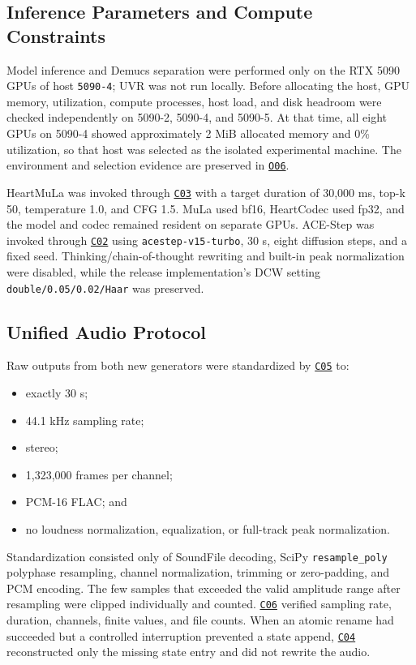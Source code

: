 \documentclass[11pt,a4paper]{article}
\newcommand{\coderef}[1]{\hyperlink{code:#1}{\texttt{#1}}}
\newcommand{\outref}[1]{\hyperlink{output:#1}{\texttt{#1}}}
\begin{document}
\subsection{Inference Parameters and Compute Constraints}

Model inference and Demucs separation were performed only on the RTX 5090 GPUs of host \texttt{5090-4}; UVR was not run locally. Before allocating the host, GPU memory, utilization, compute processes, host load, and disk headroom were checked independently on 5090-2, 5090-4, and 5090-5. At that time, all eight GPUs on 5090-4 showed approximately 2 MiB allocated memory and 0\% utilization, so that host was selected as the isolated experimental machine. The environment and selection evidence are preserved in \outref{O06}.

HeartMuLa was invoked through \coderef{C03} with a target duration of 30,000 ms, top-k 50, temperature 1.0, and CFG 1.5. MuLa used bf16, HeartCodec used fp32, and the model and codec remained resident on separate GPUs. ACE-Step was invoked through \coderef{C02} using \texttt{acestep-v15-turbo}, 30 s, eight diffusion steps, and a fixed seed. Thinking/chain-of-thought rewriting and built-in peak normalization were disabled, while the release implementation's DCW setting \texttt{double/0.05/0.02/Haar} was preserved.

\subsection{Unified Audio Protocol}

Raw outputs from both new generators were standardized by \coderef{C05} to:

\begin{itemize}
  \item exactly 30 s;
  \item 44.1 kHz sampling rate;
  \item stereo;
  \item 1,323,000 frames per channel;
  \item PCM-16 FLAC; and
  \item no loudness normalization, equalization, or full-track peak normalization.
\end{itemize}

Standardization consisted only of SoundFile decoding, SciPy \texttt{resample\_poly} polyphase resampling, channel normalization, trimming or zero-padding, and PCM encoding. The few samples that exceeded the valid amplitude range after resampling were clipped individually and counted. \coderef{C06} verified sampling rate, duration, channels, finite values, and file counts. When an atomic rename had succeeded but a controlled interruption prevented a state append, \coderef{C04} reconstructed only the missing state entry and did not rewrite the audio.
\end{document}
